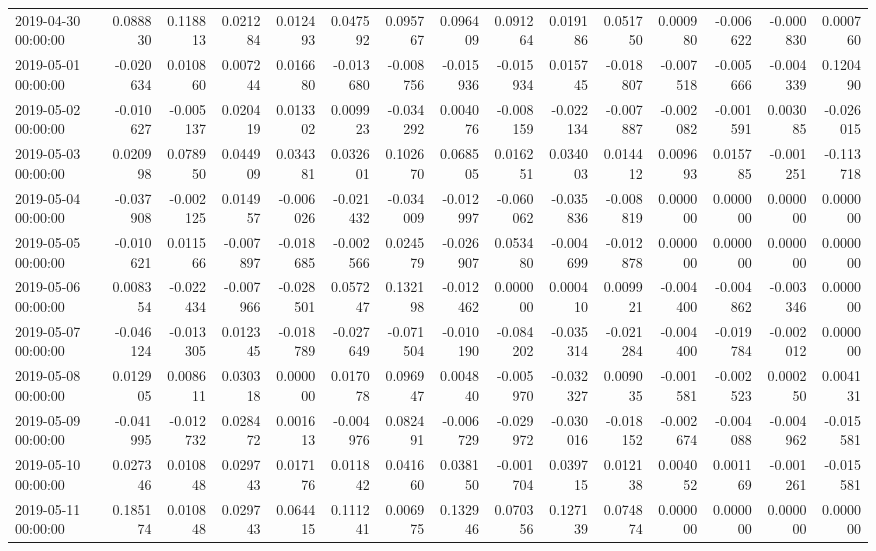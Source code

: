 \begin{tabular}{lrrrrrrrrrrrrrr}
2019-04-30 00:00:00 & 0.088830 & 0.118813 & 0.021284 & 0.012493 & 0.047592 & 0.095767 & 0.096409 & 0.091264 & 0.019186 & 0.051750 & 0.000980 & -0.006622 & -0.000830 & 0.000760 \\
2019-05-01 00:00:00 & -0.020634 & 0.010860 & 0.007244 & 0.016680 & -0.013680 & -0.008756 & -0.015936 & -0.015934 & 0.015745 & -0.018807 & -0.007518 & -0.005666 & -0.004339 & 0.120490 \\
2019-05-02 00:00:00 & -0.010627 & -0.005137 & 0.020419 & 0.013302 & 0.009923 & -0.034292 & 0.004076 & -0.008159 & -0.022134 & -0.007887 & -0.002082 & -0.001591 & 0.003085 & -0.026015 \\
2019-05-03 00:00:00 & 0.020998 & 0.078950 & 0.044909 & 0.034381 & 0.032601 & 0.102670 & 0.068505 & 0.016251 & 0.034003 & 0.014412 & 0.009693 & 0.015785 & -0.001251 & -0.113718 \\
2019-05-04 00:00:00 & -0.037908 & -0.002125 & 0.014957 & -0.006026 & -0.021432 & -0.034009 & -0.012997 & -0.060062 & -0.035836 & -0.008819 & 0.000000 & 0.000000 & 0.000000 & 0.000000 \\
2019-05-05 00:00:00 & -0.010621 & 0.011566 & -0.007897 & -0.018685 & -0.002566 & 0.024579 & -0.026907 & 0.053480 & -0.004699 & -0.012878 & 0.000000 & 0.000000 & 0.000000 & 0.000000 \\
2019-05-06 00:00:00 & 0.008354 & -0.022434 & -0.007966 & -0.028501 & 0.057247 & 0.132198 & -0.012462 & 0.000000 & 0.000410 & 0.009921 & -0.004400 & -0.004862 & -0.003346 & 0.000000 \\
2019-05-07 00:00:00 & -0.046124 & -0.013305 & 0.012345 & -0.018789 & -0.027649 & -0.071504 & -0.010190 & -0.084202 & -0.035314 & -0.021284 & -0.004400 & -0.019784 & -0.002012 & 0.000000 \\
2019-05-08 00:00:00 & 0.012905 & 0.008611 & 0.030318 & 0.000000 & 0.017078 & 0.096947 & 0.004840 & -0.005970 & -0.032327 & 0.009035 & -0.001581 & -0.002523 & 0.000250 & 0.004131 \\
2019-05-09 00:00:00 & -0.041995 & -0.012732 & 0.028472 & 0.001613 & -0.004976 & 0.082491 & -0.006729 & -0.029972 & -0.030016 & -0.018152 & -0.002674 & -0.004088 & -0.004962 & -0.015581 \\
2019-05-10 00:00:00 & 0.027346 & 0.010848 & 0.029743 & 0.017176 & 0.011842 & 0.041660 & 0.038150 & -0.001704 & 0.039715 & 0.012138 & 0.004052 & 0.001169 & -0.001261 & -0.015581 \\
2019-05-11 00:00:00 & 0.185174 & 0.010848 & 0.029743 & 0.064415 & 0.111241 & 0.006975 & 0.132946 & 0.070356 & 0.127139 & 0.074874 & 0.000000 & 0.000000 & 0.000000 & 0.000000 \\

\end{tabular}
